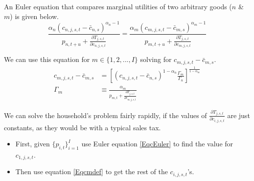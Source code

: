 \documentclass[letterpaper,11pt]{article}
\theoremstyle{definition}
\begin{document}


An Euler equation that compares marginal utilities of two arbitrary goods ($n$ \& $m$) is given below.
\begin{equation}\label{EqcEuler2}
  \frac{ \alpha_n \left( c_{n,j,s,t} - \bar c_{n,s} \right)^{\alpha_n-1} } { p_{n,t+u} + \frac{\partial T_{j,s,t}}{\partial c_{n,j,s,t}} } = \frac{ \alpha_m \left( c_{m,j,s,t} - \bar c_{m,s} \right)^{\alpha_m-1} } { p_{m,t+u} + \frac{\partial T_{j,s,t}}{\partial c_{m,j,s,t}} }
\end{equation}

We can use this equation for $m \in \{1,2,...,I\}$ solving for $c_{m,j,s,t} - \bar c_{m,s}$.
\begin{align}
    c_{m,j,s,t} - \bar c_{m,s} & = \left[ \left(c_{n,j,s,t} - \bar c_{n,s} \right)^{1-\alpha_n} \frac{\Gamma_m}{\Gamma_n} \right]^{\frac{1}{1-\alpha_m}}  \label{Eqcmdef} \\
    \Gamma_m & \equiv \frac{ \alpha_m } { p_{m,t} + \frac{\partial T_{j,s,t}}{\partial c_{m,j,s,t}} } \nonumber
\end{align}




We can solve the household's problem fairly rapidly, if the values of $\frac{\partial T_{j,s,t}}{\partial c_{i,j,s,t}}$ are just constants, as they would be with a typical sales tax.
\begin{itemize}
\item First, given $\{p_{i,t}\}_{i=1}^I$ use Euler equation \eqref{EqcEuler} to find the value for $c_{1,j,s,t}$.
\item Then use equation \eqref{Eqcmdef} to get the rest of the $c_{i,j,s,t}$'s.
\end{itemize}
\end{document}
